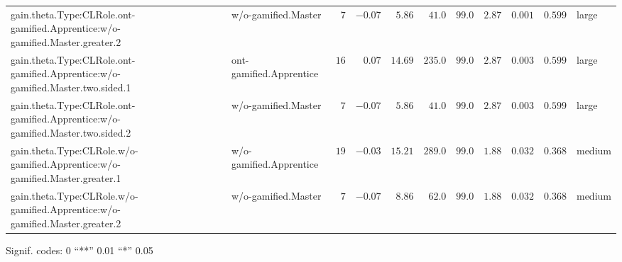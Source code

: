 \documentclass[6pt]{article}
\begin{document}
\begin{landscape}
{\begin{longtable}{llrrrrrrrrl}
gain.theta.Type:CLRole.ont-gamified.Apprentice:w/o-gamified.Master.greater.2&w/o-gamified.Master&$ 7$&$-0.07$&$ 5.86$&$ 41.0$&$ 99.0$&$2.87$&$0.001$&$0.599$&large\tabularnewline
gain.theta.Type:CLRole.ont-gamified.Apprentice:w/o-gamified.Master.two.sided.1&ont-gamified.Apprentice&$16$&$ 0.07$&$14.69$&$235.0$&$ 99.0$&$2.87$&$0.003$&$0.599$&large\tabularnewline
gain.theta.Type:CLRole.ont-gamified.Apprentice:w/o-gamified.Master.two.sided.2&w/o-gamified.Master&$ 7$&$-0.07$&$ 5.86$&$ 41.0$&$ 99.0$&$2.87$&$0.003$&$0.599$&large\tabularnewline
gain.theta.Type:CLRole.w/o-gamified.Apprentice:w/o-gamified.Master.greater.1&w/o-gamified.Apprentice&$19$&$-0.03$&$15.21$&$289.0$&$ 99.0$&$1.88$&$0.032$&$0.368$&medium\tabularnewline
gain.theta.Type:CLRole.w/o-gamified.Apprentice:w/o-gamified.Master.greater.2&w/o-gamified.Master&$ 7$&$-0.07$&$ 8.86$&$ 62.0$&$ 99.0$&$1.88$&$0.032$&$0.368$&medium\tabularnewline
\hline
\end{longtable}}\end{landscape}
\begin{flushright}{ \tiny{ Signif. codes:  0 ``**'' 0.01 ``*'' 0.05 }}\end{flushright} 
\end{document}
